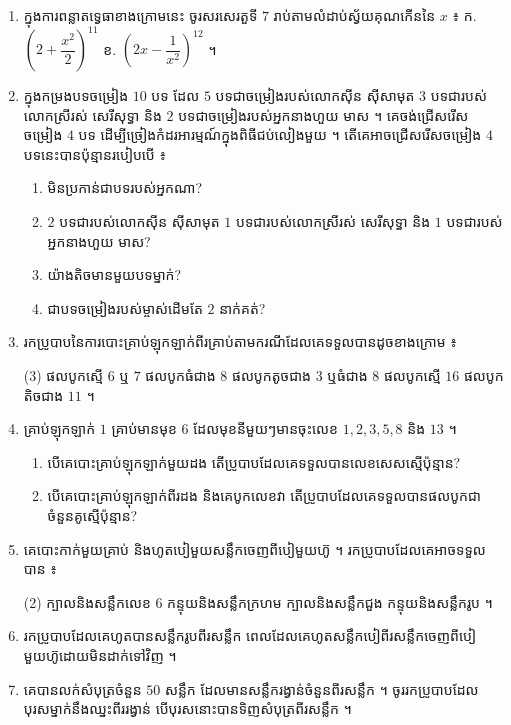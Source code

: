\begin{enumerate}[1]
  \item ក្នុងការពន្លាតទ្វេធាខាងក្រោមនេះ ចូរសរសេរតួទី $7$ រាប់តាមលំដាប់ស្វ័យគុណកើននៃ $x$ ៖ \quad ក. $\left(2 + \dfrac{x^2}{2}\right)^{11}$ \quad ខ. $\left(2x - \dfrac{1}{x^2}\right)^{12}$ ។
  \item ក្នុងកម្រងបទចម្រៀង $10$ បទ ដែល $5$ បទជាចម្រៀងរបស់លោកស៊ីន ស៊ីសាមុត $3$ បទជារបស់លោកស្រីរស់ សេរីសុទ្ធា និង $2$ បទជាចម្រៀងរបស់អ្នកនាងហួយ មាស ។ គេចង់ជ្រើសរើសចម្រៀង $4$ បទ ដើម្បីច្រៀងកំដរអារម្មណ៍ក្នុងពិធីជប់លៀងមួយ ។ តើគេអាចជ្រើសរើសចម្រៀង $4$ បទនេះបានប៉ុន្មានរបៀបបើ ៖
  \begin{enumerate}[a]
    \item មិនប្រកាន់ជាបទរបស់អ្នកណា?
    \item $2$ បទជារបស់លោកស៊ីន ស៊ីសាមុត $1$ បទជារបស់លោកស្រីរស់ សេរីសុទ្ធា និង $1$ បទជារបស់អ្នកនាងហួយ មាស?
    \item យ៉ាងតិចមានមួយបទម្នាក់?
    \item ជាបទចម្រៀងរបស់ម្ចាស់ដើមតែ $2$ នាក់គត់?
  \end{enumerate}
  \item រកប្រូបាបនៃការបោះគ្រាប់ឡុកឡាក់ពីរគ្រាប់តាមករណីដែលគេទទួលបានដូចខាងក្រោម ៖
  \begin{tasks}(3)
    \task ផលបូកស្មើ $6$ ឬ $7$
    \task ផលបូកធំជាង $8$
    \task ផលបូកតូចជាង $3$ ឬធំជាង $8$
    \task ផលបូកស្មើ $16$
    \task ផលបូកតិចជាង $11$ ។
  \end{tasks}
  \item គ្រាប់ឡុកឡាក់ $1$ គ្រាប់មានមុខ $6$ ដែលមុខនីមួយៗមានចុះលេខ $1, 2, 3, 5, 8$ និង $13$ ។
  \begin{enumerate}[a]
    \item បើគេបោះគ្រាប់ឡុកឡាក់មួយដង តើប្រូបាបដែលគេទទួលបានលេខសេសស្មើប៉ុន្មាន?
    \item បើគេបោះគ្រាប់ឡុកឡាក់ពីរដង និងគេបូកលេខវា តើប្រូបាបដែលគេទទួលបានផលបូកជាចំនួនគូស្មើប៉ុន្មាន?
  \end{enumerate}
  \item គេបោះកាក់មួយគ្រាប់ និងហូតបៀមួយសន្លឹកចេញពីបៀមួយហ៊ូ ។ រកប្រូបាបដែលគេអាចទទួលបាន ៖
  \begin{tasks}(2)
    \task ក្បាលនិងសន្លឹកលេខ $6$
    \task កន្ទុយនិងសន្លឹកក្រហម
    \task ក្បាលនិងសន្លឹកជួង
    \task កន្ទុយនិងសន្លឹករូប ។
  \end{tasks}
  \item រកប្រូបាបដែលគេហូតបានសន្លឹករូបពីរសន្លឹក ពេលដែលគេហូតសន្លឹកបៀពីរសន្លឹកចេញពីបៀមួយហ៊ូដោយមិនដាក់ទៅវិញ ។
  \item គេបានលក់សំបុត្រចំនួន $50$ សន្លឹក ដែលមានសន្លឹករង្វាន់ចំនួនពីរសន្លឹក ។ ចូររកប្រូបាបដែលបុរសម្នាក់នឹងឈ្នះពីររង្វាន់ បើបុរសនោះបានទិញសំបុត្រពីរសន្លឹក ។

\end{enumerate}
